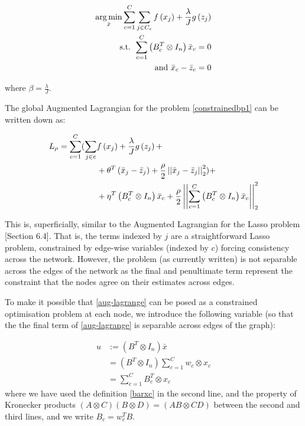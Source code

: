 \documentclass{article}
\begin{document}
\begin{align}
\operatorname*{arg\,min}_{\bar{x}} \sum_{c=1}^C \sum_{j \in C_c} f\left(x_j\right) + \frac{\lambda}{J} g\left(z_j\right)
\nonumber \\
\text{ s.t. } \sum_{c=1}^C\left(B_c^T \otimes I_n\right)\bar{x}_c = 0 \nonumber \\
\text{ and } \bar{x}_c - \bar{z}_c = 0
\label{constrainedbp1}
\end{align}

where \(\beta = \frac{\lambda}{J}\).

The global Augmented Lagrangian \cite{Boyd2010a}
 for the problem \eqref{constrainedbp1} can be written down as:

\begin{align}
L_\rho = \sum_{c=1}^C  ( \sum_{j \in c} & f\left(x_j\right) + \frac{\lambda}{J} g\left(z_j\right)  + \nonumber \\ & + \theta^T\left(\bar{x}_j - \bar{z}_j\right)  +  \frac{\rho}{2}\left|\left|\bar{x}_j-\bar{z}_j\right|\right|_2^2 ) + \nonumber \\  & + \eta^T\left(B_c^T \otimes I_n\right)\bar{x}_c + \frac{\rho}{2}\left|\left|\sum_{c=1}^C\left(B_c^T \otimes I_n\right)\bar{x}_c\right|\right|_2^2
\label{aug-lagrange}
\end{align}

This is, superficially, similar to the Augmented Lagrangian for the Lasso problem \cite{Boyd2010a}[Section 6.4]. That is, the terms indexed by \(j\) are a straightforward Lasso problem, constrained by edge-wise variables (indexed by \(c\)) forcing consistency across the network. However, the problem (as currently written) is not separable across the edges of the network as the final and penultimate term represent the constraint that the nodes agree on their estimates across edges. 

To make it possible that \ref{aug-lagrange} can be posed  as a constrained optimisation problem at each node, we introduce the following variable (so that the the final term of \ref{aug-lagrange} is separable across edges of the graph):

\begin{defn}
\begin{align*}
u &:= \left(B^T \otimes I_n\right)\bar{x} \\
& = \left(B^T \otimes I_n\right)\sum_{c=1}^C w_c \otimes x_c \\
& = \sum	_{c=1}^C B_c^T\otimes x_c
\end{align*}
where we have used the definition \eqref{barxc} in the second line, and the property of Kronecker products \((A\otimes C)(B \otimes D) = (AB \otimes CD)\) between the second and third lines, and we write \(B_c = w_c^TB\).
\end{defn}
\end{document}

